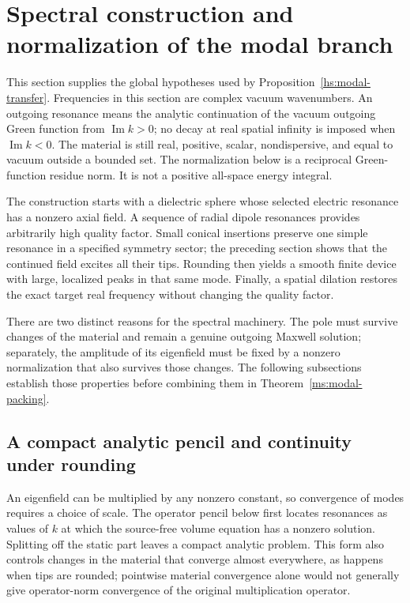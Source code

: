 \section{Spectral construction and normalization of the modal branch}
\label{ms:section}

This section supplies the global hypotheses used by
Proposition~\ref{hs:modal-transfer}.  Frequencies in this section are
complex vacuum wavenumbers.  An outgoing resonance means the
analytic continuation of the vacuum outgoing Green function from
$\operatorname{Im}k>0$; no decay at real spatial infinity is imposed
when $\operatorname{Im}k<0$.  The material is still real, positive,
scalar, nondispersive, and equal to vacuum outside a bounded set.
The normalization below is a reciprocal Green-function residue norm.
It is not a positive all-space energy integral.

The construction starts with a dielectric sphere whose selected electric
resonance has a nonzero axial field.  A sequence of radial dipole
resonances provides arbitrarily high quality factor.  Small conical
insertions preserve one simple resonance in a specified symmetry sector;
the preceding section shows that the continued field excites all their
tips.  Rounding then yields a smooth finite device with large, localized
peaks in that same mode.  Finally, a spatial dilation restores the exact
target real frequency without changing the quality factor.

There are two distinct reasons for the spectral machinery.  The pole
must survive changes of the material and remain a genuine outgoing
Maxwell solution; separately, the amplitude of its eigenfield must be
fixed by a nonzero normalization that also survives those changes.  The
following subsections establish those properties before combining them
in Theorem~\ref{ms:modal-packing}.

\subsection{A compact analytic pencil and continuity under rounding}

An eigenfield can be multiplied by any nonzero constant, so convergence
of modes requires a choice of scale.  The operator pencil below first
locates resonances as values of $k$ at which the source-free volume
equation has a nonzero solution.  Splitting off the static part leaves
a compact analytic problem.  This form also controls changes in the
material that converge almost everywhere, as happens when tips are
rounded; pointwise material convergence alone would not generally give
operator-norm convergence of the original multiplication operator.

